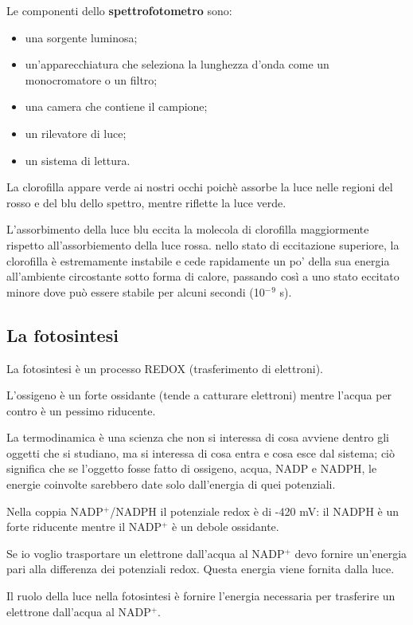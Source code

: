 \documentclass[]{article}
\begin{document}
Le componenti dello \textbf{spettrofotometro} sono:

\begin{itemize}
\itemsep1pt\parskip0pt
\item
  una sorgente luminosa;
\item
  un'apparecchiatura che seleziona la lunghezza d'onda come un
  monocromatore o un filtro;
\item
  una camera che contiene il campione;
\item
  un rilevatore di luce;
\item
  un sistema di lettura.
\end{itemize}

La clorofilla appare verde ai nostri occhi poichè assorbe la luce nelle
regioni del rosso e del blu dello spettro, mentre riflette la luce
verde.

L'assorbimento della luce blu eccita la molecola di clorofilla
maggiormente rispetto all'assorbiemento della luce rossa. nello stato di
eccitazione superiore, la clorofilla è estremamente instabile e cede
rapidamente un po' della sua energia all'ambiente circostante sotto
forma di calore, passando così a uno stato eccitato minore dove può
essere stabile per alcuni secondi (10$^-$$^9$ s).

\subsection{La fotosintesi}\label{la-fotosintesi}

La fotosintesi è un processo REDOX (trasferimento di elettroni).

L'ossigeno è un forte ossidante (tende a catturare elettroni) mentre
l'acqua per contro è un pessimo riducente.

La termodinamica è una scienza che non si interessa di cosa avviene
dentro gli oggetti che si studiano, ma si interessa di cosa entra e cosa
esce dal sistema; ciò significa che se l'oggetto fosse fatto di
ossigeno, acqua, NADP e NADPH, le energie coinvolte sarebbero date solo
dall'energia di quei potenziali.

Nella coppia NADP$^+$/NADPH il potenziale redox è di -420 mV: il NADPH è
un forte riducente mentre il NADP$^+$ è un debole ossidante.

Se io voglio trasportare un elettrone dall'acqua al NADP$^+$ devo
fornire un'energia pari alla differenza dei potenziali redox. Questa
energia viene fornita dalla luce.

Il ruolo della luce nella fotosintesi è fornire l'energia necessaria per
trasferire un elettrone dall'acqua al NADP$^+$.
\end{document}
